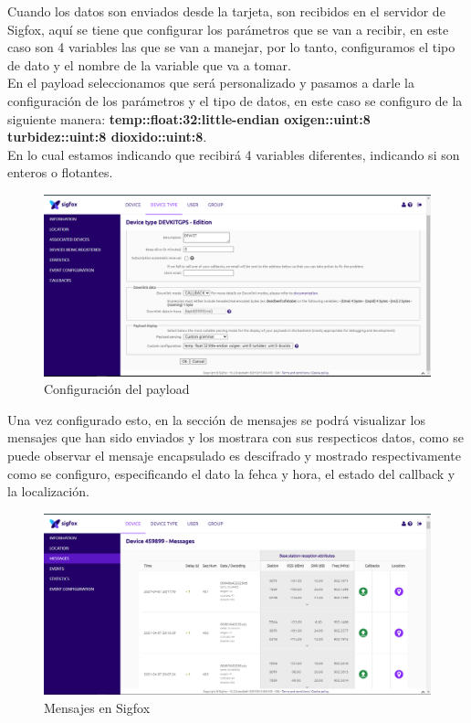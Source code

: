 \documentclass[12pt]{book}
\begin{document}
\vspace{9cm}


Cuando los datos son enviados desde la tarjeta, son recibidos en el servidor de Sigfox, aquí se tiene que configurar los parámetros que se van a recibir, en este caso son 4 variables las que se van a manejar, por lo tanto, configuramos el tipo de dato y el nombre de la variable que va a tomar. \\

En el payload seleccionamos que será personalizado y pasamos a darle la configuración de los parámetros y el tipo de datos, en este caso se configuro de la siguiente manera: 
\textbf{temp::float:32:little-endian oxigen::uint:8 turbidez::uint:8 dioxido::uint:8}. \\
En lo cual estamos indicando que recibirá 4 variables diferentes, indicando si son enteros o flotantes. \\

\begin{figure}[h]
	\centering
	\includegraphics[width=1\linewidth]{imagenes/custom_grammar}
	\caption{Configuración del payload}
	\label{fig:Configuración del payload}
\end{figure}

Una vez configurado esto, en la sección de mensajes se podrá visualizar los mensajes que han sido enviados y los mostrara con sus respecticos datos, como se puede observar el mensaje encapsulado es descifrado y mostrado respectivamente como se configuro, especificando el dato la fehca y hora, el estado del callback y la localización. \\

\begin{figure}[t!]
	\centering
	\includegraphics[width=1\linewidth]{imagenes/mensajes_sigfox}
	\caption{Mensajes en Sigfox}
	\label{fig:Mensajes en Sigfox}
\end{figure}
\end{document}
